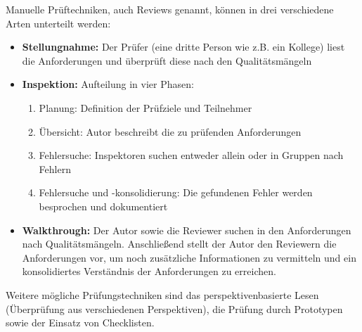 Manuelle Prüftechniken, auch Reviews genannt, können in drei verschiedene Arten unterteilt werden:
\begin{itemize}
    \item \textbf{Stellungnahme:} Der Prüfer (eine dritte Person wie z.B. ein Kollege) liest die Anforderungen und überprüft diese nach den Qualitätsmängeln
    \item \textbf{Inspektion:} Aufteilung in vier Phasen:
    \begin{enumerate}
        \item Planung: Definition der Prüfziele und Teilnehmer
        \item Übersicht: Autor beschreibt die zu prüfenden Anforderungen
        \item Fehlersuche: Inspektoren suchen entweder allein oder in Gruppen nach Fehlern
        \item Fehlersuche und -konsolidierung: Die gefundenen Fehler werden besprochen und dokumentiert
    \end{enumerate}
    \item \textbf{Walkthrough:} Der Autor sowie die Reviewer suchen in den Anforderungen nach Qualitätsmängeln.
        Anschließend stellt der Autor den Reviewern die Anforderungen vor, um noch zusätzliche Informationen zu vermitteln und ein konsolidiertes Verständnis der Anforderungen zu erreichen.
\end{itemize}\autocite[vgl.][Seite 32ff]{Maulhardt.c}

Weitere mögliche Prüfungstechniken sind das perspektivenbasierte Lesen (Überprüfung aus verschiedenen Perspektiven), die Prüfung durch Prototypen sowie der Einsatz von Checklisten\autocite[vgl.][Seite 33]{Maulhardt.c}.
